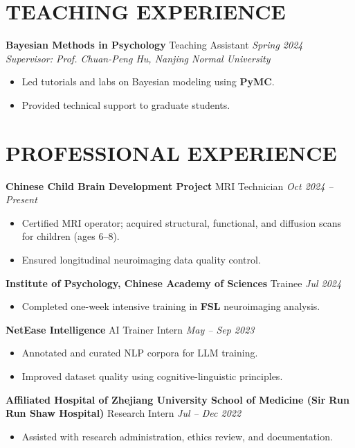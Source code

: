 \documentclass[10pt,a4paper]{article}
\begin{document}
\vspace{1 em} 

\section*{TEACHING EXPERIENCE}
\textbf{Bayesian Methods in Psychology} \hfill Teaching Assistant \hfill \textit{Spring 2024} \\
\textit{Supervisor: Prof. Chuan-Peng Hu, Nanjing Normal University}
\begin{itemize}
    \item Led tutorials and labs on Bayesian modeling using \textbf{PyMC}.
    \item Provided technical support to graduate students.
\end{itemize}

\vspace{1 em} 

\section*{PROFESSIONAL EXPERIENCE}
\textbf{Chinese Child Brain Development Project} \hfill MRI Technician \hfill \textit{Oct 2024 – Present}
\begin{itemize}
    \item Certified MRI operator; acquired structural, functional, and diffusion scans for children (ages 6–8).
    \item Ensured longitudinal neuroimaging data quality control.
\end{itemize}

\textbf{Institute of Psychology, Chinese Academy of Sciences} \hfill Trainee \hfill \textit{Jul 2024}
\begin{itemize}
    \item Completed one-week intensive training in \textbf{FSL} neuroimaging analysis.
\end{itemize}

\textbf{NetEase Intelligence} \hfill AI Trainer Intern \hfill \textit{May – Sep 2023}
\begin{itemize}
    \item Annotated and curated NLP corpora for LLM training.
    \item Improved dataset quality using cognitive-linguistic principles.
\end{itemize}

\textbf{Affiliated Hospital of Zhejiang University School of Medicine (Sir Run Run Shaw Hospital)} \hfill Research Intern \hfill \textit{Jul – Dec 2022}
\begin{itemize}
    \item Assisted with research administration, ethics review, and documentation.
\end{itemize}
\end{document}
